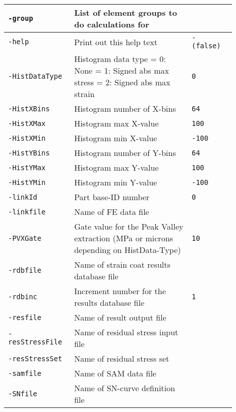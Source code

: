 {\begin{tabular}{|>{\raggedright} p{0.23\linewidth}| p{0.48\linewidth}| p{0.18\linewidth}|}
  \hline
  \texttt{-group} &   List of element groups to do calculations for  &  \\
  \hline
  \texttt{-help} &   Print out this help text  & \texttt{- (false)}   \\
  \hline
  \texttt{-HistDataType} &   Histogram data type\newline
                             = 0: None\newline
                             = 1: Signed abs max stress\newline
                             = 2: Signed abs max strain   & \texttt{0}   \\
  \hline
  \texttt{-HistXBins} &   Histogram number of X-bins  & \texttt{64}   \\
  \hline
  \texttt{-HistXMax} &   Histogram max X-value  & \texttt{100}   \\
  \hline
  \texttt{-HistXMin} &   Histogram min X-value  & \texttt{-100}   \\
  \hline
  \texttt{-HistYBins} &   Histogram number of Y-bins  & \texttt{64}   \\
  \hline
  \texttt{-HistYMax} &   Histogram max Y-value  & \texttt{100}   \\
  \hline
  \texttt{-HistYMin} &    Histogram min Y-value  & \texttt{-100}   \\
  \hline
  \texttt{-linkId} &    Part base-ID number  & \texttt{0}   \\
  \hline
  \texttt{-linkfile} &    Name of FE data file  &  \\
  \hline
  \texttt{-PVXGate} &    Gate value for the Peak Valley extraction (MPa or microns depending on HistData-Type)  & \texttt{10}   \\
  \hline
  \texttt{-rdbfile} &    Name of strain coat results database file  &  \\
  \hline
  \texttt{-rdbinc} &    Increment number for the results database file   & \texttt{1} \\
  \hline
  {\tt-resfile} & Name of result output file & \\
  \hline
  {\tt-resStressFile} & Name of residual stress input file & \\
  \hline
  {\tt-resStressSet} & Name of residual stress set & \\
  \hline
  {\tt-samfile} & Name of SAM data file & \\
  \hline
  {\tt-SNfile} & Name of SN-curve definition file & \\
  \hline
\end{tabular}}

